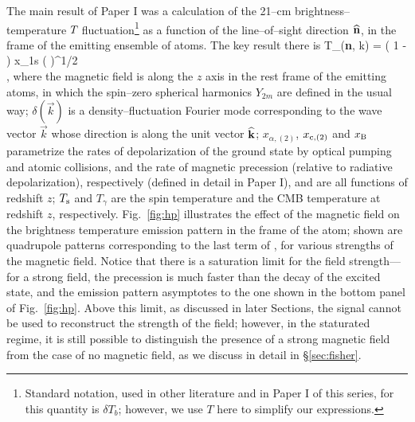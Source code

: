 The main result of Paper I was a calculation of the 21--cm brightness--temperature $T_{\rm }$ fluctuation\footnote{Standard notation, used in other literature and in Paper I of this series, for this quantity is $\delta T_b$; however, we use $T$ here to simplify our expressions.} as a function of the line--of--sight direction ${\bf{\widehat n}}$, in the frame of the emitting ensemble of atoms. The key result there is
\beq
\bga
   T_{\rm }({\bf{\widehat n}}, {{\vec k}}) = \left( 1 -  \right) x_{1{\rm s}} \left(  \right)^{1/2} \\
  \times {} \mbox{,} 
\ega
\label{eq:tbsoln}
\eeq
where the magnetic field is along the $z$ axis in the rest frame of the emitting atoms, in which the spin--zero spherical harmonics $Y_{2 m}$ are defined in the usual way; $\delta(\vec k)$ is a density--fluctuation Fourier mode corresponding to the wave vector $\vec k$ whose direction is along the unit vector $\bf{\widehat k}$; $x_{\alpha, (2)}$, $x_{{\rm c}, (2)}$ and $x_{\rm B}$ parametrize the rates of depolarization of the ground state by optical pumping and atomic collisions, and the rate of magnetic precession (relative to radiative depolarization), respectively (defined in detail in Paper I), and are all functions of redshift $z$; $T_{\rm s}$ and $T_\gamma$ are the spin temperature and the CMB temperature at redshift $z$, respectively. Fig.~\ref{fig:hp} illustrates the effect of the magnetic field on the brightness temperature emission pattern in the frame of the atom; shown are quadrupole patterns corresponding to the last term of \eq{\ref{eq:tbsoln}}, for various strengths of the magnetic field. Notice that there is a saturation limit for the field strength---for a strong field, the precession is much faster than the decay of the excited state, and the emission pattern asymptotes to the one shown in the bottom panel of Fig.~\ref{fig:hp}. Above this limit, as discussed in later Sections, the signal cannot be used to reconstruct the strength of the field; however, in the staturated regime, it is still possible to distinguish the presence of a strong magnetic field from the case of no magnetic field, as we discuss in detail in \S\ref{sec:fisher}.
